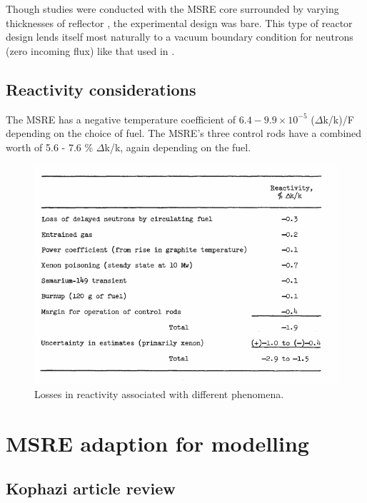 \documentclass{article}
\let\Oldsection\section
\renewcommand{\section}{\FloatBarrier\Oldsection}
\let\Oldsubsection\subsection
\renewcommand{\subsection}{\FloatBarrier\Oldsubsection}
\begin{document}
Though studies were conducted with the \gls{MSRE} core surrounded by varying
thicknesses of reflector \cite{haubenreich_msre_1964}, the experimental design
was bare. This type of reactor design lends itself most naturally to a vacuum
boundary condition for neutrons (zero incoming flux) like that used in
\cite{dulla_neutron_2004}.

\subsection{Reactivity considerations}

The \gls{MSRE} has a negative temperature coefficient of $6.4 - 9.9 \times10^{-5}$
($\Delta$k/k)/\textdegree F depending on the choice of
fuel. \cite{robertson_msre_1965} The \gls{MSRE}'s three control rods have a combined
worth of 5.6 - 7.6 \% $\Delta$k/k, again depending on the
fuel. \cite{robertson_msre_1965}

\begin{figure}[htpb]
  \centering
  \includegraphics[max height=.5\textheight,max width=\textwidth,keepaspectratio]{reactivity-losses.png}
  \caption{Losses in reactivity associated with different
    phenomena. \cite{robertson_msre_1965}}
  \label{fig:reactivity_losses}
\end{figure}

\section{\gls{MSRE} adaption for modelling}

\subsection{Kophazi article review}
\end{document}
